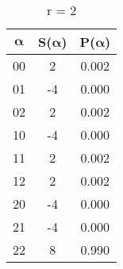 \begin{table}[h]
    \begin{subtable}{.3\textwidth}
        \centering
        \caption{r = 2}
        \begin{tabular}{ccc}
            \toprule
             $\boldsymbol{\alpha}$ & S($\boldsymbol{\alpha}$) & P($\boldsymbol{\alpha}$)\\
            \midrule
            00 & 2 & 0.002 \\
            01 & -4 & 0.000 \\
            02 & 2 & 0.002 \\
            10 & -4 & 0.000 \\
            11 & 2 & 0.002 \\
            12 & 2 & 0.002 \\
            20 & -4 & 0.000 \\
            21 & -4 & 0.000 \\
            22 & 8 & 0.990 \\
          \bottomrule
        \end{tabular}
    \end{subtable}
\end{table}
